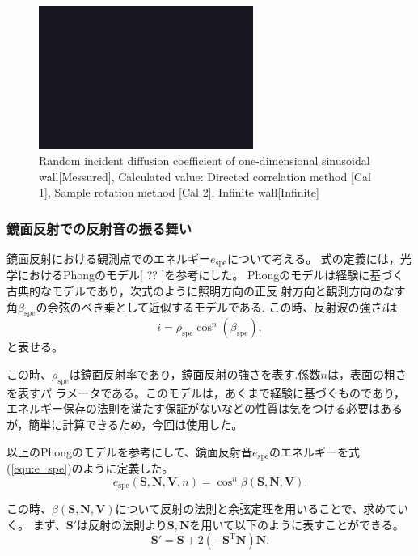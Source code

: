 \begin{figure}[t]
  \vspace{1zh}
  \centering
    \includegraphics[width=70mm]{images/fig_sample.png} 
  \caption{ Random incident diffusion coefficient of one-dimensional sinusoidal wall[Messured], Calculated value: Directed correlation method [Cal 1], Sample rotation method [Cal 2], Infinite wall[Infinite]}
  \label{fig:diffuse_rate}
\end{figure}

\subsubsection{鏡面反射での反射音の振る舞い\label{spec}}
鏡面反射における観測点でのエネルギー$e_\mathrm{spe}$について考える。
式の定義には，光学におけるPhongのモデル[ ?? ]を参考にした。
Phongのモデルは経験に基づく古典的なモデルであり，次式のように照明方向の正反
射方向と観測方向のなす角$\beta_\mathrm{spe}$の余弦のべき乗として近似するモデルである.
この時、反射波の強さ$i$は
\begin{equation}
	\label{equ:phong}
	i = \rho_\mathrm{spe}\cos^{n}(\beta_\mathrm{spe}) ,
\end{equation}
と表せる。

この時、$\rho_\mathrm{spe}$は鏡面反射率であり，鏡面反射の強さを表す.係数$n$は，表面の粗さを表すパ ラメータである。このモデルは，あくまで経験に基づくものであり，エネルギー保存の法則を満たす保証がないなどの性質は気をつける必要はあるが，簡単に計算できるため，今回は使用した。

以上のPhongのモデルを参考にして、鏡面反射音$e_\mathrm{spe}$のエネルギーを式(\ref{equ:e_spe})のように定義した。
\begin{equation}
    \label{equ:e_spe}
      e_\mathrm{spe}(\mathbf{S}, \mathbf{N}, \mathbf{V}, n) = \cos^{n}\beta(\mathbf{S}, \mathbf{N}, \mathbf{V}).
\end{equation}

この時、$\beta(\mathbf{S}, \mathbf{N}, \mathbf{V})$について反射の法則と余弦定理を用いることで、求めていく。
まず、$\mathbf{S'}$は反射の法則より$\mathbf{S}, \mathbf{N}$を用いて以下のように表すことができる。
\begin{equation}
	\mathbf{S'} = \mathbf{S} + 2(- \mathbf{S}^{\mathrm{T}} \mathbf{N}) \mathbf{N}.
\end{equation}

